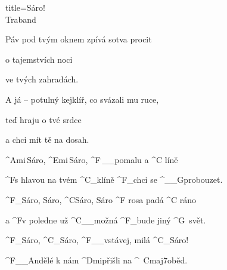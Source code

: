 \begin{song}{title=\centering Sáro! \\\normalsize Traband  \vspace*{-0.3cm}}
{\begin{minipage}[t]{0.48\textwidth}
\sloka
	Páv pod tvým oknem zpívá sotva procit
	
	o tajemstvích noci
	
	ve tvých zahradách.
	
	A já -- potulný kejklíř, co svázali mu ruce,

	teď hraju o tvé srdce
	
	a chci mít tě na dosah.

\sloka
	^{Ami\,}Sáro, ^{Emi\,}Sáro, ^{F\,{\color{white}\_\_}}pomalu a ^{C\,\,}líně

	
	^{F}s hlavou na tvém ^{C{\color{white}\_}}klíně ^{F{\color{white}\_}}chci se ^{{\color{white}\_\_}G}probouzet.
	
	^{F{\color{white}\_}}Sáro, Sáro, ^{C}Sáro, Sáro ^{F\,\,}rosa padá ^{C\,\,}ráno
	
	a ^{F}v poledne už ^{C{\color{white}\_\_}}možná ^{F{\color{white}\_}}bude jiný ^{G\,\,\,}svět.

	^{F{\color{white}\_}}Sáro, ^{C{\color{white}\_}}Sáro, ^{F{\color{white}\_\_}}vstávej, milá ^{C{\color{white}\_}}Sáro!

	^{F{\color{white}\_\_}}Andělé k nám ^{Dmi}přišli na ^{\,\,\,Cmaj7}oběd.


\end{minipage}
}
\setcounter{Slokočet}{0}
\end{song}

